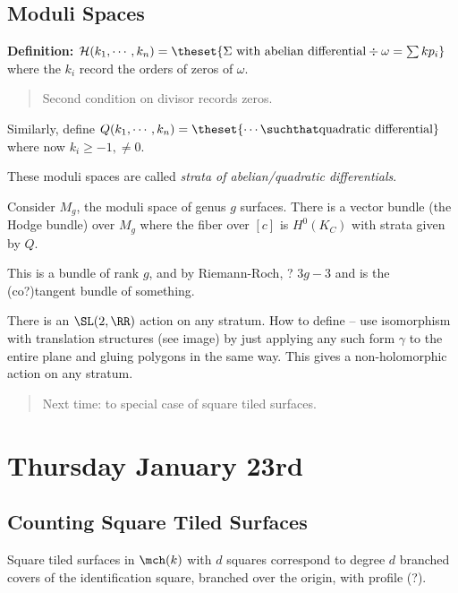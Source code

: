 \hypertarget{moduli-spaces}{%
\subsection{Moduli Spaces}\label{moduli-spaces}}

\textbf{Definition:}
\(\mathcal{H}(k_1, \cdots, k_n) = \theset{ \Sigma \text{ with abelian differential} \div \omega = \sum k p_i}\)
where the \(k_i\) record the orders of zeros of \(\omega\).

\begin{quote}
Second condition on divisor records zeros.
\end{quote}

Similarly, define
\(Q(k_1, \cdots, k_n) = \theset{\cdots \suchthat \text{quadratic differential}}\)
where now \(k_i \geq -1, \neq 0\).

These moduli spaces are called \emph{strata of abelian/quadratic
differentials}.

Consider \(M_g\), the moduli space of genus \(g\) surfaces. There is a
vector bundle (the Hodge bundle) over \(M_g\) where the fiber over
\([c]\) is \(H^0(K_C)\) with strata given by \(Q\).

This is a bundle of rank \(g\), and by Riemann-Roch, ? \(3g-3\) and is
the (co?)tangent bundle of something.

There is an \(\SL(2, \RR)\) action on any stratum. How to define -- use
isomorphism with translation structures (see image) by just applying any
such form \(\gamma\) to the entire plane and gluing polygons in the same
way. This gives a non-holomorphic action on any stratum.

\begin{quote}
Next time: to special case of square tiled surfaces.
\end{quote}

\hypertarget{thursday-january-23rd}{%
\section{Thursday January 23rd}\label{thursday-january-23rd}}

\hypertarget{counting-square-tiled-surfaces}{%
\subsection{Counting Square Tiled
Surfaces}\label{counting-square-tiled-surfaces}}

Square tiled surfaces in \(\mch(k)\) with \(d\) squares correspond to
degree \(d\) branched covers of the identification square, branched over
the origin, with profile (?).

